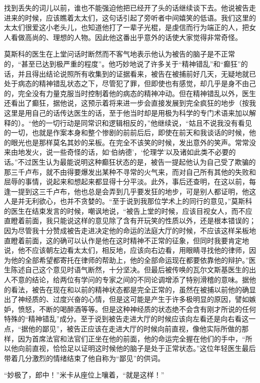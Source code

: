 找到丢失的词儿以前，谁也不能强迫他把已经开了头的话继续谈下去。他说被告走进来的时候，应该瞧着太太们，这句话引起了旁听者中间嬉笑的低语。我们这里的太太们很爱这小老头儿，也知道他打了一辈子光棍，是虔信而行为端正的人，把女人看做高尚的、理想的人物。因此他这番出乎意外的话使大家觉得非常奇怪。
\par 莫斯科的医生在上堂问话时断然而不客气地表示他认为被告的脑子是不正常的，“甚至已达到极严重的程度”。他巧妙地说了许多关于“精神错乱”和“癫狂”的话，并且得出结论说照所有收集到的证据看来，被告在被捕前好几天，无疑地就已处于病态的精神错乱状态之下，尽管犯了罪，但即使也有感觉，却几乎是身不由己的，完全没有力量克服当时控制着他的病态的精神冲动。但在精神错乱以外，医生还看出了癫狂，据他说，这预示着将来进一步会直接发展到完全疯狂的地步（按我这里是用自己的话传达医生的话，至于他当时却是用极为科学的专门术语来加以解释的）。“他的一切行动是同常识和逻辑相反的，”他继续说，“姑且不说我没有看见的一切，也就是作案本身和整个惨剧的前前后后，即使在前天和我谈话的时候，他的眼光也是那样莫名其妙的呆板。在完全不该笑的时候，发出意外的笑声。常常没来由地发火，说一些奇怪的话，如‘伯纳德’，‘伦理学’以及诸如此类不必要的话。”不过医生认为最能说明这种癫狂状态的是，被告一提起他认为自己受了欺骗的那三千卢布，就不由得要爆发出某种不寻常的火气来，而对自己所有其他的失败和屈辱的事情，说起来和想起来都显得十分平淡。此外，事后还查明，在这以前，每逢一提到这三千卢布，他也总是会弄到几乎要发狂的地步，可是别人都证明，他这人是并无利欲心，也并不贪婪的。“至于说到我那位学术上的同行的意见，”莫斯科的医生在结束发言的时候，嘲讽地说，“被告上堂的时候，应该目视女人，而不应直瞪着前面，我只能说这样的意见除了含有开玩笑的性质以外，还是根本错误的；因为尽管我十分赞成被告走进决定他的命运的法庭大厅的时候，不应该这样呆板地直瞪着前面，这的确可以认作是他在这时精神不正常的征象，但同时我要肯定地说，他不应该朝左边看太太们，相反地，应该向右边看，用眼睛寻找他的律师，因为他的全部希望都寄托在律师的帮助上，他的全部命运现在都要依靠他的辩护。”医生陈述自己这个意见时语气断然，十分坚决。但最后被传唤的瓦尔文斯基医生的出人不意的结论，给两位有学问的专家之间的不同论调增添了特别滑稽的意味。据他的看法，被告在现在和以前的精神状态都是完全正常的，虽然在被捕以前他的确显出了神经质的、过度兴奋的心情，但是这可能是产生于许多极明显的原因，譬如嫉妒，愤怒，不断的喝醉酒等等。但是这种神经质的状态绝不会含有刚才所说的任何特殊的“精神错乱”成分。至于说到被告走进大厅的时候应该向左看还是向右看这一点，“据他的鄙见”，被告正应该在走进大厅的时候向前直视，像他实际所做的那样，因为首席法官和法官们正坐在他的前面，他的命运完全握在他们的手中，“所以他向前直视，恰恰足以证明这时候他的脑子是处于正常状态。”这位年轻医生最后带着几分激烈的情绪结束了他自称为“鄙见”的供词。
\par “妙极了，郎中！”米卡从座位上嚷着，“就是这样！”
